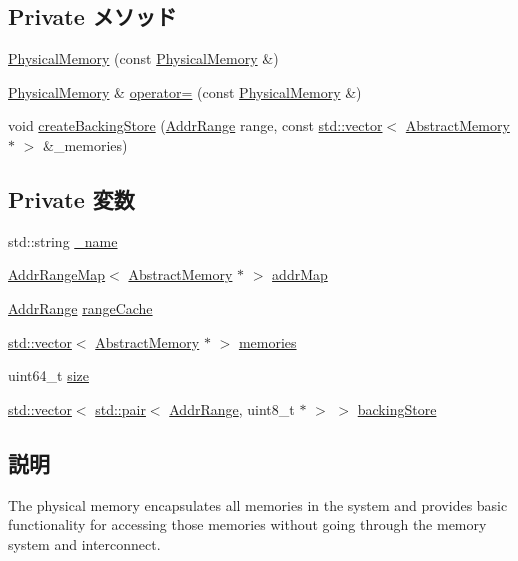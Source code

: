 \subsection*{Private メソッド}
\begin{DoxyCompactItemize}
\item 
\hyperlink{classPhysicalMemory_a5247a8a9ca8b14d01253a6861b8b3bf2}{PhysicalMemory} (const \hyperlink{classPhysicalMemory}{PhysicalMemory} \&)
\item 
\hyperlink{classPhysicalMemory}{PhysicalMemory} \& \hyperlink{classPhysicalMemory_a3ce2a36a848a843e660964c9bc4237e8}{operator=} (const \hyperlink{classPhysicalMemory}{PhysicalMemory} \&)
\item 
void \hyperlink{classPhysicalMemory_a4a205bfc337649ce4e62fe5cb5c7579a}{createBackingStore} (\hyperlink{classAddrRange}{AddrRange} range, const \hyperlink{classstd_1_1vector}{std::vector}$<$ \hyperlink{classAbstractMemory}{AbstractMemory} $\ast$ $>$ \&\_\-memories)
\end{DoxyCompactItemize}
\subsection*{Private 変数}
\begin{DoxyCompactItemize}
\item 
std::string \hyperlink{classPhysicalMemory_aaf2ed934b37cbbd236fdd1b01a5f5005}{\_\-name}
\item 
\hyperlink{classAddrRangeMap}{AddrRangeMap}$<$ \hyperlink{classAbstractMemory}{AbstractMemory} $\ast$ $>$ \hyperlink{classPhysicalMemory_ab5cfae3fb0ca282c337c30f0f36ea8d5}{addrMap}
\item 
\hyperlink{classAddrRange}{AddrRange} \hyperlink{classPhysicalMemory_a356adf3dbde22587d20fa428473a00d6}{rangeCache}
\item 
\hyperlink{classstd_1_1vector}{std::vector}$<$ \hyperlink{classAbstractMemory}{AbstractMemory} $\ast$ $>$ \hyperlink{classPhysicalMemory_a4c874036afca619454444242943675f4}{memories}
\item 
uint64\_\-t \hyperlink{classPhysicalMemory_af931a8871310b4dad23f0f0b0f623560}{size}
\item 
\hyperlink{classstd_1_1vector}{std::vector}$<$ \hyperlink{classstd_1_1pair}{std::pair}$<$ \hyperlink{classAddrRange}{AddrRange}, uint8\_\-t $\ast$ $>$ $>$ \hyperlink{classPhysicalMemory_a0c347314a9f0b468ed498abaf77bbe44}{backingStore}
\end{DoxyCompactItemize}


\subsection{説明}
The physical memory encapsulates all memories in the system and provides basic functionality for accessing those memories without going through the memory system and interconnect.

